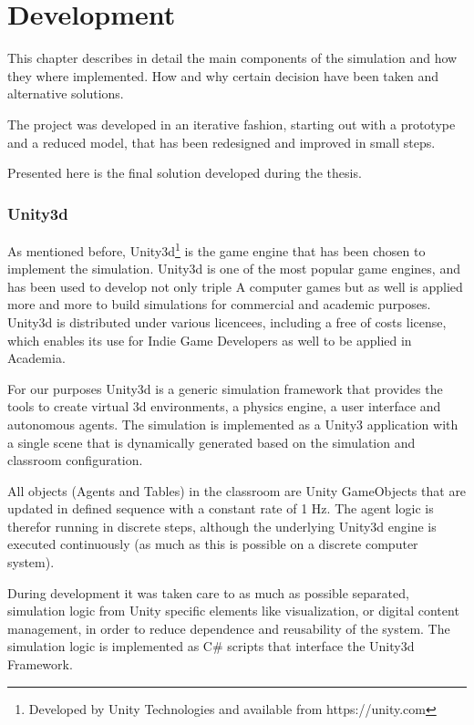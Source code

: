 \chapter{Development}
This chapter describes in detail the main components of the simulation and how
they where implemented. How and why certain decision have been taken and alternative
solutions.

The project was developed in an iterative fashion, starting out with a
prototype and a reduced model, that has been redesigned and improved in small steps.

Presented here is the final solution developed during the thesis.

\subsection{Unity3d}
As mentioned before, Unity3d\footnote{Developed by Unity Technologies and available from https://unity.com}
is the game engine that has been chosen to implement the simulation. Unity3d is one
of the most popular game engines, and has been used to develop not only triple A
computer games but as well is applied more and more to build simulations for commercial and academic purposes.
Unity3d is distributed under various licencees, including a free of costs license, which
enables its use for Indie Game Developers as well to be applied in Academia.

\bb

For our purposes Unity3d is a generic simulation framework that provides the tools
to create virtual 3d environments, a physics engine, a user interface and autonomous
agents. The simulation is implemented as a Unity3 application with a single scene
that is dynamically generated based on the simulation and classroom configuration.

All objects (Agents and Tables) in the classroom are Unity GameObjects that are
updated in defined sequence with a constant rate of 1 Hz. The agent logic is therefor
running in discrete steps, although the underlying Unity3d engine is executed
continuously (as much as this is possible on a discrete computer system).

During development it was taken care to as much as possible separated, simulation logic
from Unity specific elements like visualization, or digital content management,
in order to reduce dependence and reusability of the system. The simulation logic
is implemented as C\# scripts that interface the Unity3d Framework.

